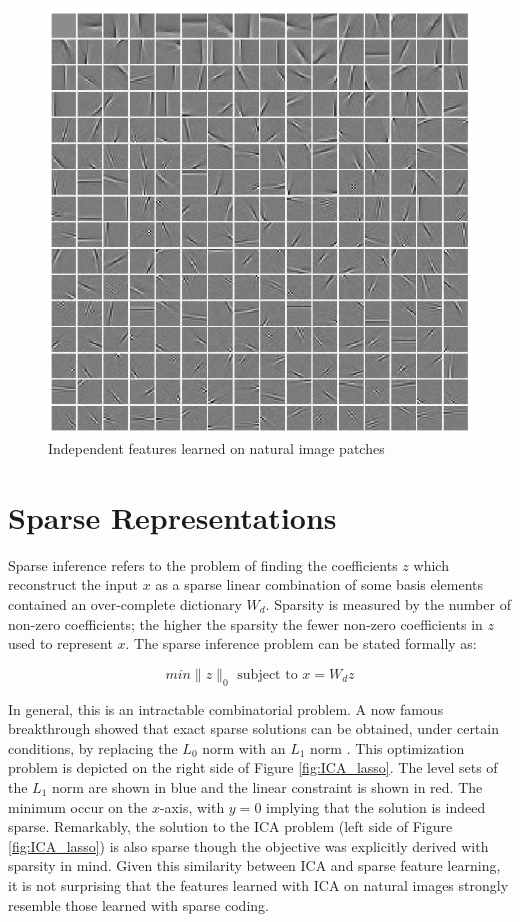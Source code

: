 \begin{figure} 
\centering
\includegraphics[scale=0.4]{./figures/related_work/ICABasis.png} 
\caption{Independent features learned on natural image patches}
\label{fig:ICA_features} 
\end{figure} 

\section{Sparse Representations} 
Sparse inference refers to the problem of finding the coefficients $z$ which
reconstruct the input $x$ as a sparse linear combination of some basis elements
contained an over-complete dictionary $W_d$. Sparsity is measured by the number
of non-zero coefficients; the higher the sparsity the fewer non-zero
coefficients in $z$ used to represent $x$.  
The sparse inference problem can be stated formally as: 

\begin{equation} 
min \|z\|_0 \mbox{ subject to } x = W_dz 
\end{equation} 

In general, this is an intractable combinatorial problem. A now famous
breakthrough showed that exact sparse solutions can be obtained, under certain
conditions, by replacing the $L_0$ norm with an $L_1$ norm \cite{candes2006}.
This optimization problem is depicted on the right side of Figure
\ref{fig:ICA_lasso}.  The level sets of the $L_1$ norm are shown in blue and
the linear constraint is shown in red. The minimum occur on the $x$-axis, with
$y=0$ implying that the solution is indeed sparse. Remarkably, the solution to
the ICA problem (left side of Figure \ref{fig:ICA_lasso}) is also sparse though the
objective was explicitly derived with sparsity in mind. Given this similarity 
between ICA and sparse feature learning, it is not surprising that the features 
learned with ICA on natural images strongly resemble those learned with sparse coding. 

